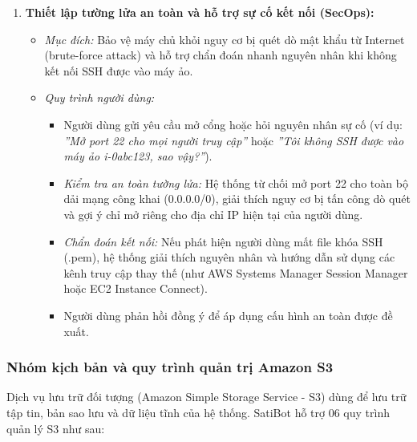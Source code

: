 \documentclass[a4paper,12pt]{article}
\begin{document}
\begin{enumerate}
  \item \textbf{Thiết lập tường lửa an toàn và hỗ trợ sự cố kết nối (SecOps):}
  \begin{itemize}
    \item \textit{Mục đích:} Bảo vệ máy chủ khỏi nguy cơ bị quét dò mật khẩu từ Internet (brute-force attack) và hỗ trợ chẩn đoán nhanh nguyên nhân khi không kết nối SSH được vào máy ảo.
    \item \textit{Quy trình người dùng:}
    \begin{itemize}
      \item Người dùng gửi yêu cầu mở cổng hoặc hỏi nguyên nhân sự cố (ví dụ: \textit{''Mở port 22 cho mọi người truy cập''} hoặc \textit{''Tôi không SSH được vào máy ảo i-0abc123, sao vậy?''}).
      \item \textit{Kiểm tra an toàn tường lửa:} Hệ thống từ chối mở port 22 cho toàn bộ dải mạng công khai (0.0.0.0/0), giải thích nguy cơ bị tấn công dò quét và gợi ý chỉ mở riêng cho địa chỉ IP hiện tại của người dùng.
      \item \textit{Chẩn đoán kết nối:} Nếu phát hiện người dùng mất file khóa SSH (.pem), hệ thống giải thích nguyên nhân và hướng dẫn sử dụng các kênh truy cập thay thế (như AWS Systems Manager Session Manager hoặc EC2 Instance Connect).
      \item Người dùng phản hồi đồng ý để áp dụng cấu hình an toàn được đề xuất.
    \end{itemize}
  \end{itemize}
\end{enumerate}

\subsubsection{Nhóm kịch bản và quy trình quản trị Amazon S3}

Dịch vụ lưu trữ đối tượng (Amazon Simple Storage Service - S3) dùng để lưu trữ tập tin, bản sao lưu và dữ liệu tĩnh của hệ thống. SatiBot hỗ trợ 06 quy trình quản lý S3 như sau:
\end{document}
